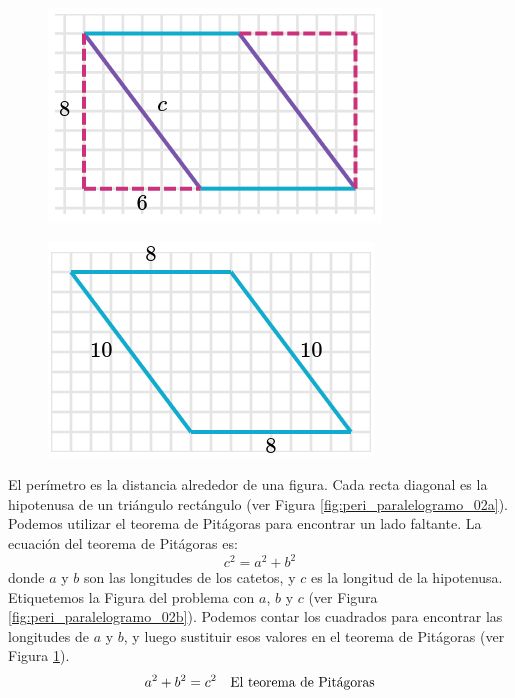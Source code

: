 \begin{solutionbox}{16cm}
\begin{minipage}{0.3\textwidth}
        \begin{figure}[H]
            \centering
            \includegraphics[width=0.6\linewidth]{../images/peri_paralelogramo_02c.png}
            \caption{}
            \label{fig:peri_paralelogramo_02c}
        \end{figure}
        \begin{figure}[H]
            \centering
            \includegraphics[width=0.6\linewidth]{../images/peri_paralelogramo_02d.png}
            \caption{}
            \label{fig:peri_paralelogramo_02d}
        \end{figure}
    \end{minipage}\hfill
    \begin{minipage}{0.65\textwidth}
        El perímetro es la distancia alrededor de una figura.
        Cada recta diagonal es la hipotenusa de un triángulo rectángulo (ver Figura \ref{fig:peri_paralelogramo_02a}).
        Podemos utilizar el teorema de Pitágoras para encontrar un lado faltante.
        La ecuación del teorema de Pitágoras es:
        \[c^2=a^2+b^2\]
        donde $a$ y $b$ son las longitudes de los catetos, y $c$ es la longitud de la hipotenusa.
        Etiquetemos la Figura del problema con $a$, $b$ y $c$ (ver Figura \ref{fig:peri_paralelogramo_02b}).
        Podemos contar los cuadrados para encontrar las longitudes de $a$ y $b$, y luego sustituir esos valores en el teorema de Pitágoras (ver Figura \ref{fig:peri_paralelogramo_02c}).
        \begin{align*}
            a^2+b^2  =c^2 & \text{\quad El teorema de Pitágoras}                          \\

\end{align*}
\end{minipage}
\end{solutionbox}
